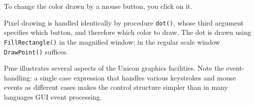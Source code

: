 
To change the color drawn by a mouse button, you click on it.


Pixel drawing is handled identically by procedure \texttt{dot()}, whose third
argument specifies which button, and therefore which color to draw.
The dot is drawn using \texttt{FillRectangle()} in the magnified window; in
the regular scale window \texttt{DrawPoint()} suffices.


Pme illustrates several aspects of the Unicon graphics facilities. Note
the event-handling: a single case expression that handles various
keystrokes and mouse events as different cases makes the control
structure simpler than in many languages{\textquotesingle} GUI event
processing.

